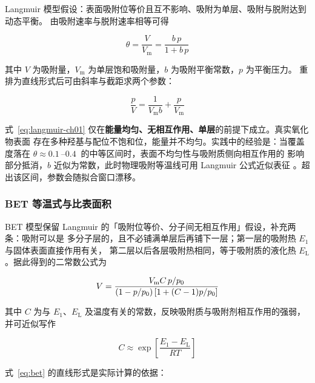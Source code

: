 Langmuir 模型假设：表面吸附位等价且互不影响、吸附为单层、吸附与脱附达到动态平衡。
由吸附速率与脱附速率相等可得

\begin{equation}\label{eq:langmuir-ch01}
\theta=\frac{V}{V_{\mathrm{m}}}=\frac{b\,p}{1+b\,p}
\end{equation}

其中 $V$ 为吸附量，$V_{\mathrm{m}}$ 为单层饱和吸附量，$b$ 为吸附平衡常数，$p$ 为平衡压力。
重排为直线形式后可由斜率与截距求两个参数：

\begin{equation}\label{eq:langmuir-lin}
\frac{p}{V}=\frac{1}{V_{\mathrm{m}}b}+\frac{p}{V_{\mathrm{m}}}
\end{equation}

\begin{keycond}
式~\eqref{eq:langmuir-ch01} 仅在\textbf{能量均匀、无相互作用、单层}的前提下成立。真实氧化物表面
存在多种羟基与配位不饱和位，能量并不均匀。实践中的经验是：当覆盖度落在
$\theta\approx\qtyrange{0.1}{0.4}{}$ 的中等区间时，表面不均匀性与吸附质侧向相互作用的
影响部分抵消，$b$ 近似为常数，此时物理吸附等温线可用 Langmuir 公式近似表征
。超出该区间，参数会随拟合窗口漂移。
\end{keycond}

\subsubsection{BET 等温式与比表面积}

BET 模型保留 Langmuir 的「吸附位等价、分子间无相互作用」假设，补充两条：吸附可以是
多分子层的，且不必铺满单层后再铺下一层；第一层的吸附热 $E_1$ 与固体表面直接作用有关，
第二层以后各层吸附热相同，等于吸附质的液化热 $E_{\mathrm{L}}$。据此得到的二常数公式为

\begin{equation}\label{eq:bet}
V=\frac{V_{\mathrm{m}}C\,p/p_{0}}{\left(1-p/p_{0}\right)\left[1+(C-1)p/p_{0}\right]}
\end{equation}

其中 $C$ 为与 $E_1$、$E_{\mathrm{L}}$ 及温度有关的常数，反映吸附质与吸附剂相互作用的强弱，
并可近似写作

\begin{equation}\label{eq:cdef}
C\approx\exp\!\left[\frac{E_1-E_{\mathrm{L}}}{RT}\right]
\end{equation}

式~\eqref{eq:bet} 的直线形式是实际计算的依据：

